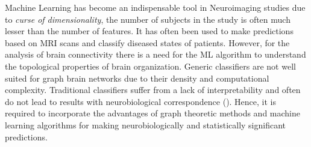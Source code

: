 \documentclass[msthesis.tex]{subfiles}
\begin{document}
Machine Learning has become an indispensable tool in Neuroimaging studies due to \textit{curse of dimensionality}, the number of subjects in the study is often much lesser than the number of features. It has often been used to make predictions based on MRI scans and classify diseased states of patients. However, for the analysis of brain connectivity there is a need for the ML algorithm to understand the topological properties of brain organization. Generic classifiers are not well suited for graph brain networks due to their density and computational complexity. Traditional classifiers suffer from a lack of interpretability and often do not lead to results with neurobiological correspondence (\cite{10.3389/fnagi.2017.00329}). Hence, it is required to incorporate the advantages of graph theoretic methods and machine learning algorithms for making neurobiologically and statistically significant predictions. 
\end{document}
